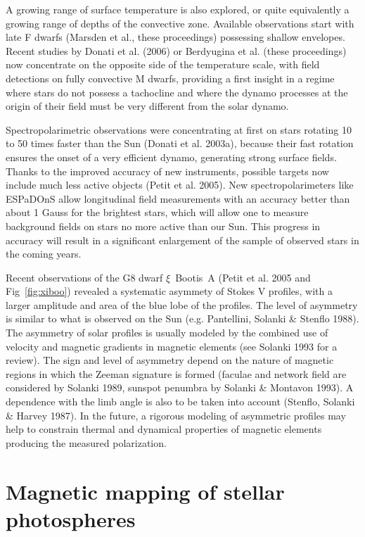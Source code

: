 \documentclass[11pt,twoside]{article}
\begin{document}
A growing range of surface temperature is also explored, or quite equivalently a growing range of depths of the convective zone. Available observations start with late F dwarfs (Marsden et al., these proceedings) possessing shallow envelopes. Recent studies by Donati et al. (2006) or Berdyugina et al. (these proceedings) now concentrate on the opposite side of the temperature scale, with field detections on fully convective M dwarfs, providing a first insight in a regime where stars do not possess a tachocline and where the dynamo processes at the origin of their field must be very different from the solar dynamo.    

Spectropolarimetric observations were concentrating at first on stars rotating 10 to 50 times faster than the Sun (Donati et al. 2003a), because their fast rotation ensures the onset of a very efficient dynamo, generating strong surface fields. Thanks to the improved accuracy of new instruments, possible targets now include much less active objects (Petit et al. 2005).  New spectropolarimeters like ESPaDOnS allow longitudinal field measurements with an accuracy better than about 1 Gauss for the brightest stars, which will allow one to measure background fields on stars no more active than our Sun. This progress in accuracy will result in a significant enlargement of the sample of observed stars in the coming years. 

Recent observations of the G8 dwarf $\xi$~Bootis~A (Petit et al. 2005 and Fig~\ref{fig:xiboo}) revealed a systematic asymmety of Stokes V profiles, with a larger amplitude and area of the blue lobe of the profiles. The level of asymmetry is similar to what is observed on the Sun (e.g. Pantellini, Solanki \& Stenflo 1988). The asymmetry of solar profiles is usually modeled by the combined use of velocity and magnetic gradients in magnetic elements (see Solanki 1993 for a review). The sign and level of asymmetry depend on the nature of magnetic regions in which the Zeeman signature is formed (faculae and network field are considered by Solanki 1989, sunspot penumbra by Solanki \& Montavon 1993). A dependence with the limb angle is also to be taken into account (Stenflo, Solanki \& Harvey 1987). In the future, a rigorous modeling of asymmetric profiles may help to constrain thermal and dynamical properties of magnetic elements producing the measured polarization.

\section{Magnetic mapping of stellar photospheres}
\end{document}
